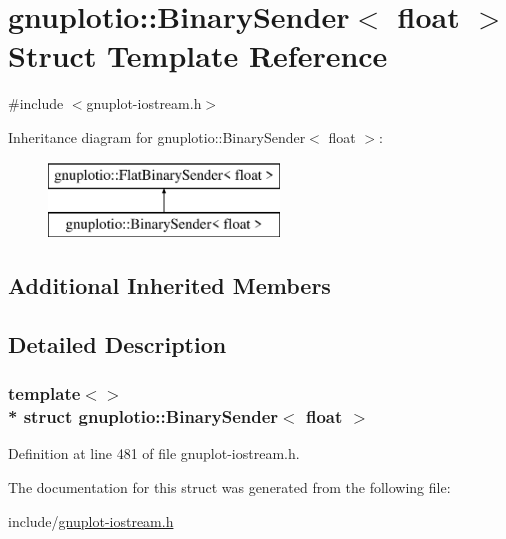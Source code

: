 \hypertarget{structgnuplotio_1_1_binary_sender_3_01float_01_4}{}\section{gnuplotio\+:\+:Binary\+Sender$<$ float $>$ Struct Template Reference}
\label{structgnuplotio_1_1_binary_sender_3_01float_01_4}


{\ttfamily \#include $<$gnuplot-\/iostream.\+h$>$}

Inheritance diagram for gnuplotio\+:\+:Binary\+Sender$<$ float $>$\+:\begin{figure}[H]
\begin{center}
\leavevmode
\includegraphics[height=2.000000cm]{structgnuplotio_1_1_binary_sender_3_01float_01_4}
\end{center}
\end{figure}
\subsection*{Additional Inherited Members}


\subsection{Detailed Description}
\subsubsection*{template$<$$>$\\*
struct gnuplotio\+::\+Binary\+Sender$<$ float $>$}



Definition at line 481 of file gnuplot-\/iostream.\+h.



The documentation for this struct was generated from the following file\+:\begin{DoxyCompactItemize}
\item 
include/\hyperlink{gnuplot-iostream_8h}{gnuplot-\/iostream.\+h}\end{DoxyCompactItemize}
